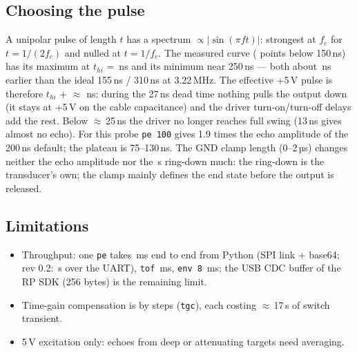 \documentclass[10pt,a4paper]{article}
\newcommand{\us}{\,\textmu s}
\newcommand{\cmd}[1]{\texttt{#1}}
\begin{document}
\subsection{Choosing the pulse}
A unipolar pulse of length $t$ has a spectrum $\propto |\sin(\pi f t)|$: strongest at $f_c$ for $t = 1/(2f_c)$ and nulled at
$t = 1/f_c$. The measured curve (\vhinpts{} points below 150\,ns) has its maximum at $t_{hi}$ = \vhibest\,ns and its minimum near
250\,ns — both about \vdeltaeff\,ns earlier than the ideal 155\,ns / 310\,ns at 3.22\,MHz. The effective +5\,V pulse is therefore
$t_{hi}$ + $\approx$\,\vdeltaeff\,ns: during the 27\,ns dead time nothing pulls the output down (it stays at +5\,V on the cable
capacitance) and the driver turn-on/turn-off delays add the rest. Below $\approx$\,25\,ns the driver no longer reaches full
swing (13\,ns gives almost no echo). For this probe \cmd{pe 100} gives 1.9 times the echo amplitude of the 200\,ns default;
the plateau is 75–130\,ns. The GND clamp length (0–2\,µs) changes neither the echo amplitude nor the \vdeadzone\us{} ring-down much:
the ring-down is the transducer's own; the clamp mainly defines the end state before the output is released.
\subsection{Limitations}
\begin{itemize}
  \item Throughput: one \cmd{pe} takes \xFmtBsix\,ms end to end from Python (SPI link + base64; rev 0.2: \vpetime\,s over the UART),
        \cmd{tof} \xTofTime\,ms, \cmd{env 8} \xEnvTimeA\,ms; the USB CDC buffer of the RP SDK (256 bytes) is the remaining limit.
  \item Time-gain compensation is by steps (\cmd{tgc}), each costing $\approx$\,17\us{} of switch transient.
  \item 5\,V excitation only: echoes from deep or attenuating targets need averaging.
\end{itemize}

\end{document}
